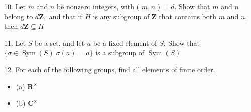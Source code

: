 \newpage%
\begin{mdframed}[style=darkQuesion]
10. Let $m$ and $n$ be nonzero integers, with ( $m, n$ ) = $d$. Show that $m$ and $n$ belong to $d \mathbf{Z},$ and that if $H$ is any subgroup of $\mathbf{Z}$ that contains both $m$ and $n,$ then $d \mathbf{Z} \subseteq H$
\end{mdframed}

\begin{mdframed}[style=darkAnswer,frametitle={Joe Starr}]

\end{mdframed}
\newpage
\begin{mdframed}[style=darkQuesion]
11. Let $S$ be a set, and let $a$ be a fixed element of $S .$ Show that $\{\sigma \in \operatorname{Sym}(S) | \sigma(a)=a\}$ is a subgroup of $\operatorname{Sym}(S)$

\end{mdframed}

\begin{mdframed}[style=darkAnswer,frametitle={Joe Starr}]

\end{mdframed}
\newpage
\begin{mdframed}[style=darkQuesion]
12. For each of the following groups, find all elements of finite order. 
\begin{itemize}
   \item []{
 (a) $\mathbf{R}^{\times}$
   }
   \item []{
 (b) $\mathbf{C}^{\times}$
   }
\end{itemize}

\end{mdframed}

